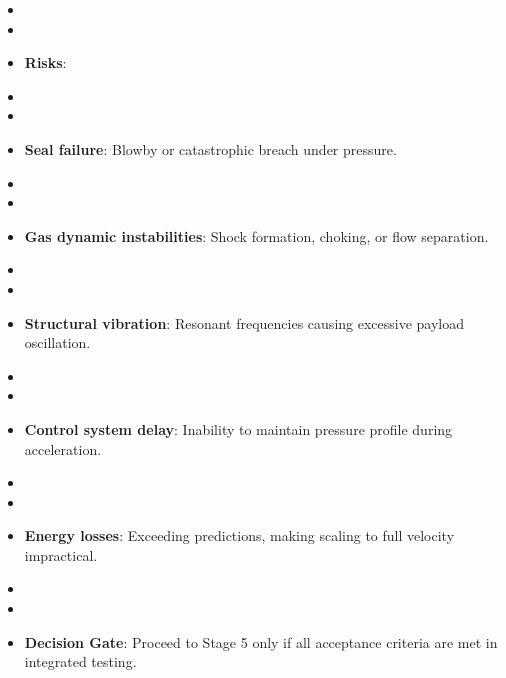\begin{itemize}
\begin{enumerate}
            \item Energy efficiency: Measured $\eta_{sys} > 5\%$ (vs. ideal).
            \item Safety systems: Abort function triggers within 50 ms of fault detection; gas venting reduces pressure to safe levels in $< 1$ s.
        \end{enumerate}
    \item \item \item \textbf{Risks}:
        \item \item \item \textbf{Seal failure}: Blowby or catastrophic breach under pressure.
        \item \item \item \textbf{Gas dynamic instabilities}: Shock formation, choking, or flow separation.
        \item \item \item \textbf{Structural vibration}: Resonant frequencies causing excessive payload oscillation.
        \item \item \item \textbf{Control system delay}: Inability to maintain pressure profile during acceleration.
        \item \item \item \textbf{Energy losses}: Exceeding predictions, making scaling to full velocity impractical.
    \item \item \item \textbf{Decision Gate}: Proceed to Stage 5 only if all acceptance criteria are met in integrated testing.
\end{itemize}

